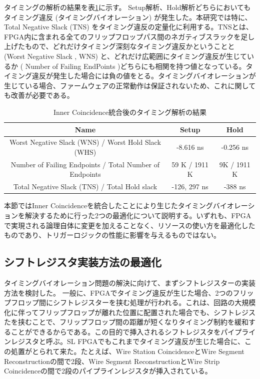 タイミングの解析の結果を表\ref{tab:timing_before}に示す。
Setup解析、Hold解析どちらにおいてもタイミング違反 (タイミングバイオレーション) が発生した。本研究では特に、Total Negative Slack (TNS) をタイミング違反の定量化に利用する。TNSとは、FPGA内に含まれる全てのフリップフロップパス間のネガティブスラックを足し上げたもので、どれだけタイミング深刻なタイミング違反かということと (Worst Negative Slack , WNS) と、どれだけ広範囲にタイミング違反が生じているか ( Number of Failing EndPoints )どちらにも相関を持つ値となっている。タイミング違反が発生した場合には負の値をとる。タイミングバイオレーションが生じている場合、ファームウェアの正常動作は保証されないため、これに関しても改善が必要である。
\begin{table}[]
    \centering
    \caption{Inner Coincidence統合後のタイミング解析の結果}
    \label{tab:timing_before}
    \begin{tabular}{|c|c|c|}
    \hline
    Name                                                    & Setup         & Hold        \\ \hline\hline
    Worst Negative Slack (WNS) / Worst Hold Slack (WHS)     & -8.616 ns     & -0.256 ns   \\ \hline
    Number of Failing Endpoints / Total Number of Endpoints & 59 K / 1911 K & 9K / 1911 K \\ \hline
    Total Negative Slack (TNS) / Total Hold slack           & -126, 297 ns  & -388 ns     \\ \hline
    \end{tabular}
\end{table}

本節ではInner Coincidenceを統合したことにより生じたタイミングバイオレーションを解決するために行った2つの最適化について説明する。いずれも、FPGAで実現される論理自体に変更を加えることなく、リソースの使い方を最適化したものであり、トリガーロジックの性能に影響を与えるものではない。

\subsection{シフトレジスタ実装方法の最適化}
タイミングバイオレーション問題の解決に向けて、まずシフトレジスターの実装方法を検討した。
一般に、FPGAでタイミング違反が生じた場合、2つのフリップフロップ間にシフトレジスターを挟む処理が行われる。これは、回路の大規模化に伴ってフリップフロップが離れた位置に配置された場合でも、シフトレジスたを挟むことで、フリップフロップ間の距離が短くなりタイミング制約を緩和することができるからである。この目的で挿入されるシフトレジスタをパイプラインレジスタと呼ぶ。SL FPGAでもこれまでタイミング違反が生じた場合に、この処置がとられて来た。たとえば、Wire Station CoincidenceとWire Segment Reconstructionの間で2段、Wire Segment ReconstructionとWire Strip Coincidenceの間で2段のパイプラインレジスタが挿入されている。

